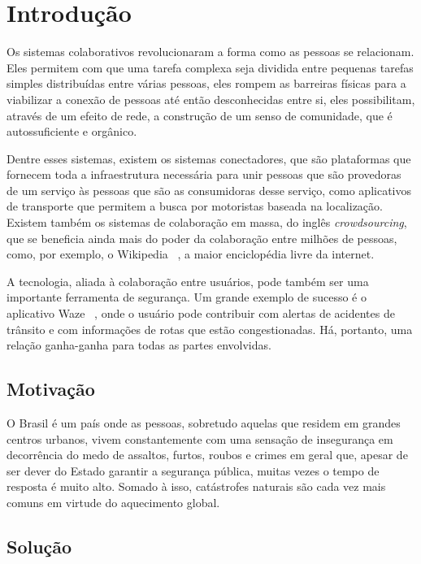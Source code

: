 \chapter{Introdução}

Os sistemas colaborativos revolucionaram a forma como as pessoas se relacionam. Eles permitem com que uma tarefa complexa seja dividida entre pequenas tarefas simples distribuídas entre várias pessoas, eles rompem as barreiras físicas para a viabilizar a conexão de pessoas até então desconhecidas entre si, eles possibilitam, através de um efeito de rede, a construção de um senso de comunidade, que é autossuficiente e orgânico.

Dentre esses sistemas, existem os sistemas conectadores, que são plataformas que fornecem toda a infraestrutura necessária para unir pessoas que são provedoras de um serviço às pessoas que são as consumidoras desse serviço, como aplicativos de transporte que permitem a busca por motoristas baseada na localização. Existem também os sistemas de colaboração em massa, do inglês \emph{crowdsourcing}, que se beneficia ainda mais do poder da colaboração entre milhões de pessoas, como, por exemplo, o Wikipedia ~\cite{wikipedia}, a maior enciclopédia livre da internet.

A tecnologia, aliada à colaboração entre usuários, pode também ser uma importante ferramenta de segurança. Um grande exemplo de sucesso é o aplicativo Waze ~\cite{waze}, onde o usuário pode contribuir com alertas de acidentes de trânsito e com informações de rotas que estão congestionadas. Há, portanto, uma relação ganha-ganha para todas as partes envolvidas.

\section{Motivação}

O Brasil é um país onde as pessoas, sobretudo aquelas que residem em grandes centros urbanos, vivem constantemente com uma sensação de insegurança em decorrência do medo de assaltos, furtos, roubos e crimes em geral que, apesar de ser dever do Estado garantir a segurança pública, muitas vezes o tempo de resposta é muito alto. Somado à isso, catástrofes naturais são cada vez mais comuns em virtude do aquecimento global.

\section{Solução}


